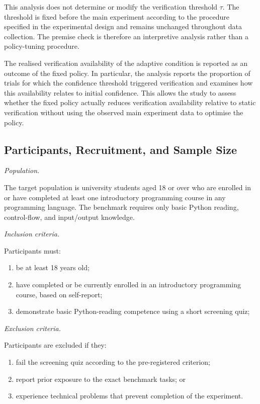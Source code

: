 \documentclass[oneside,final,14pt,a4paper]{extreport}
\begin{document}
This analysis does not determine or modify the verification threshold $\tau$.
The threshold is fixed before the main experiment according to the procedure
specified in the experimental design and remains unchanged throughout data
collection. The premise check is therefore an interpretive analysis rather
than a policy-tuning procedure.

The realised verification availability of the adaptive condition is reported
as an outcome of the fixed policy. In particular, the analysis reports the
proportion of trials for which the confidence threshold triggered verification
and examines how this availability relates to initial confidence. This allows
the study to assess whether the fixed policy actually reduces verification
availability relative to static verification without using the observed main
experiment data to optimise the policy.

\subsection{Participants, Recruitment, and Sample Size}
\label{subsec:participants}

\emph{Population.}

The target population is university students aged 18 or over who are enrolled
in or have completed at least one introductory programming course in any
programming language. The benchmark requires only basic Python reading,
control-flow, and input/output knowledge.

\emph{Inclusion criteria.}

Participants must:

\begin{enumerate}
\item be at least 18 years old;
\item have completed or be currently enrolled in an introductory programming
course, based on self-report;
\item demonstrate basic Python-reading competence using a short screening
quiz;
\end{enumerate}

\emph{Exclusion criteria.}

Participants are excluded if they:

\begin{enumerate}
\item fail the screening quiz according to the pre-registered criterion;
\item report prior exposure to the exact benchmark tasks; or
\item experience technical problems that prevent completion of the experiment.
\end{enumerate}
\end{document}
